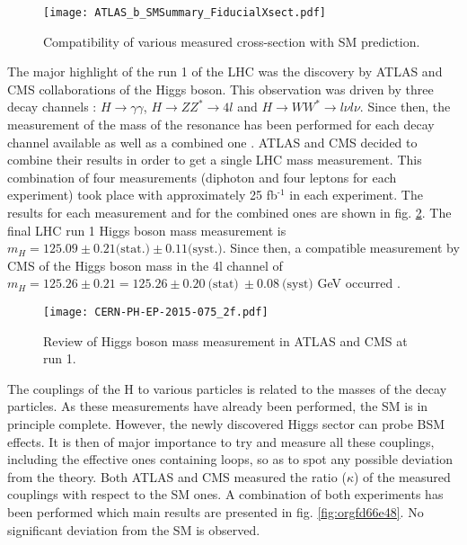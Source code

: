 \begin{figure}[htbp]
\centering
\texttt{[image: ATLAS\_b\_SMSummary\_FiducialXsect.pdf]}
\caption{\label{fig:org87b5838}
Compatibility of various measured cross-section with SM prediction. \cite{ATLASSMTest}}
\end{figure}


The major highlight of the run 1 of the LHC was the discovery by ATLAS and CMS collaborations of the Higgs boson.
This observation was driven by three decay channels : \(H\rightarrow\gamma\gamma\), \(H\rightarrow ZZ^*\rightarrow 4l\) and \(H\rightarrow WW^* \rightarrow l\nu l\nu\).
Since then, the measurement of the mass of the resonance has been performed for each decay channel available as well as a combined one \cite{CMS-HIG-14-009,CERN-PH-EP-2014-122}.
ATLAS and CMS decided to combine \cite{CERN-PH-EP-2015-075} their results in order to get a single LHC mass measurement.
This combination of four measurements (diphoton and four leptons for each experiment) took place with approximately 25 fb\(^{\text{-1}}\) in each experiment.
The results for each measurement and for the combined ones are shown in fig. \ref{fig:orga7ceb32}.
The final LHC run 1 Higgs boson mass measurement is  $m_H = 125.09 \pm 0.21 \text{(stat.)} \pm 0.11 \text{(syst.)}$.
Since then, a compatible measurement by CMS of the Higgs boson mass in the 4l channel of \(m_H=125.26\pm0.21=125.26 \pm 0.20\ \text{(stat)}\ \pm 0.08\ \text{(syst)}\) GeV occurred \cite{CMS-PAS-HIG-16-041,CMS-HIG-16-041}.

\begin{figure}[htbp]
\centering
\texttt{[image: CERN-PH-EP-2015-075\_2f.pdf]}
\caption{\label{fig:orga7ceb32}
Review of Higgs boson mass measurement in ATLAS and CMS at run 1. \cite{CERN-PH-EP-2015-075}}
\end{figure}

The couplings of the H to various particles is related to the masses of the decay particles.
As these measurements have already been performed, the SM is in principle complete.
However, the newly discovered Higgs sector can probe BSM effects.
It is then of major importance to try and measure all these couplings, including the effective ones containing loops, so as to spot any possible deviation from the theory.
 Both ATLAS \cite{ATLAS-CONF-2015-007} and CMS \cite{CMS-HIG-14-009} measured the ratio ($\kappa$) of the measured couplings with respect to the SM ones.
A combination of both experiments \cite{CERN-EP-2016-100} has been performed which main results are presented in fig. \ref{fig:orgfd66e48}.
No significant deviation from the SM is observed.

